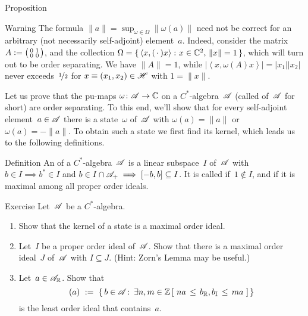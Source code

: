 \documentclass[a]{subfiles}
\begin{document}
\begin{parsec}
\begin{point}{Proposition}
\begin{point}{Warning}
The formula
$\|a\|=\sup_{\omega\in\Omega} \|\omega(a)\|$
need not be correct
for an arbitrary (not necessarily self-adjoint)
element~$a$.
Indeed,
consider the matrix $A:=\smash{%
\bigl(\begin{smallmatrix}0&1\\0&0\end{smallmatrix}\bigr)}$,
and the collection $\Omega=\{\,\left<x,(\,\cdot\,)x\right>\colon 
x\in \mathbb{C}^2,\,\|x\|=1\,\}$,
which will turn out to be order separating.
We have $\|A\|=1$,
while $\left| \left<x,\omega(A)x\right>\right|
 =\left|x_1\right|\left|x_2\right|$
 never exceeds~$\nicefrac{1}{2}$
for $x\equiv (x_1,x_2)\in \mathscr{H}$ with $1=\|x\|$.
\end{point}
\end{point}
\end{parsec}
\begin{parsec}%
\begin{point}%
Let us prove
that the pu-maps $\omega\colon \mathscr{A}\to\mathbb{C}$
on a $C^*$-algebra~$\mathscr{A}$
(called  of~$\mathscr{A}$ for short)
are order separating.
To this end, we'll show that 
for every self-adjoint element~$a\in \mathscr{A}$
there is a state~$\omega$ of~$\mathscr{A}$ with $\omega(a)=\|a\|$ or 
$\omega(a)=-\|a\|$.
To obtain such a state
we first find its kernel,
which leads us to the following definitions.
\end{point}
\begin{point}{Definition}%
An 
of a $C^*$-algebra~$\mathscr{A}$
is a linear subspace~$I$ of~$\mathscr{A}$
with $b\in I\implies b^*\in I$
and $b\in I\cap\mathscr{A}_{+}\implies [-b,b]\subseteq I$.
It is called  if~$1\notin I$,
and  if it is maximal among all proper order ideals.
\end{point}
\begin{point}{Exercise}%
Let~$\mathscr{A}$ be a $C^*$-algebra.
\begin{enumerate}
\item
Show that the kernel of a state is a maximal order ideal.
\item
Let~$I$ be a proper order ideal of~$\mathscr{A}$.
Show that there is a maximal 
order ideal~$J$ of~$\mathscr{A}$ with $I\subseteq J$.
(Hint: Zorn's Lemma may be useful.)
\item
Let~$a\in \mathscr{A}_{\mathbb{R}}$.
Show that 
\begin{equation*}
(a)\ := \ \{\, b\in \mathscr{A}\colon\, \exists n,m\in \mathbb{Z}\,
[\ na \,\leq\, b_{\mathbb{R}},b_{\mathbb{I}}\,\leq\, ma\ ]\,\}
\end{equation*}
is the least order ideal that contains~$a$.


\end{enumerate}
\end{point}
\end{parsec}
\end{document}
